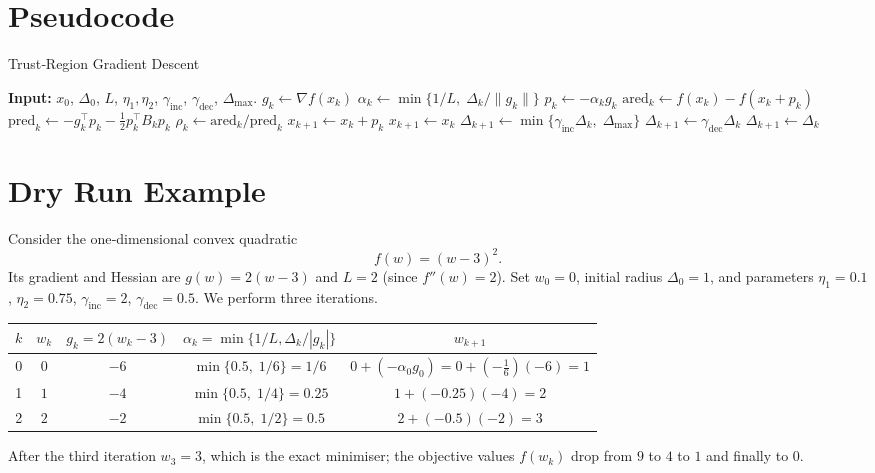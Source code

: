 \documentclass{article}
\begin{document}
\section*{Pseudocode}
\begin{algorithm}[H]
\caption{Trust‑Region Gradient Descent}
\begin{algorithmic}[1]
\STATE \textbf{Input:} $x_0$, $\Delta_0$, $L$, $\eta_1,\eta_2$, $\gamma_{\text{inc}}$, $\gamma_{\text{dec}}$, $\Delta_{\max}$.
    \STATE $g_k\gets \nabla f(x_k)$
    \STATE $\alpha_k\gets \min\{1/L,\;\Delta_k/\|g_k\|\}$
    \STATE $p_k\gets -\alpha_k g_k$ 
    \STATE $\text{ared}_k\gets f(x_k)-f(x_k+p_k)$
    \STATE $\text{pred}_k\gets -g_k^{\top}p_k-\tfrac12 p_k^{\top}B_k p_k$
    \STATE $\rho_k\gets \text{ared}_k/\text{pred}_k$
        \STATE $x_{k+1}\gets x_k+p_k$
    \ELSE
        \STATE $x_{k+1}\gets x_k$
    \ENDIF
        \STATE $\Delta_{k+1}\gets \min\{\gamma_{\text{inc}}\Delta_k,\;\Delta_{\max}\}$
        \STATE $\Delta_{k+1}\gets \gamma_{\text{dec}}\Delta_k$
    \ELSE
        \STATE $\Delta_{k+1}\gets \Delta_k$
    \ENDIF
\ENDFOR
\end{algorithmic}
\end{algorithm}

\section*{Dry Run Example}
Consider the one‑dimensional convex quadratic
\[
f(w)=(w-3)^2 .
\]
Its gradient and Hessian are $g(w)=2(w-3)$ and $L=2$ (since $f''(w)=2$).  
Set $w_0=0$, initial radius $\Delta_0=1$, and parameters
$\eta_1=0.1$, $\eta_2=0.75$, $\gamma_{\text{inc}}=2$, $\gamma_{\text{dec}}=0.5$.
We perform three iterations.

\begin{center}
\begin{tabular}{c|c|c|c|c}
$k$ & $w_k$ & $g_k=2(w_k-3)$ & $\alpha_k=\min\{1/L,\Delta_k/|g_k|\}$ & $w_{k+1}$\\ \hline
0 & $0$ & $-6$ & $\min\{0.5,\;1/6\}=1/6$ & $0+(-\alpha_0 g_0)=0+(-\frac16)(-6)=1$\\
1 & $1$ & $-4$ & $\min\{0.5,\;1/4\}=0.25$ & $1+(-0.25)(-4)=2$\\
2 & $2$ & $-2$ & $\min\{0.5,\;1/2\}=0.5$ & $2+(-0.5)(-2)=3$\\
\end{tabular}
\end{center}
After the third iteration $w_3=3$, which is the exact minimiser; the objective
values $f(w_k)$ drop from $9$ to $4$ to $1$ and finally to $0$.
\end{document}
